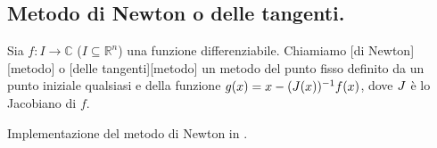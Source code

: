 \subsection{Metodo di Newton o delle tangenti.}
\label{MetodiNumericiPerEquazioni_MetodoDiNewton}
\begin{Definition}
	Sia $f: I \rightarrow \mathbb{C}$ ($I \subseteq \mathbb{R}^n$) una funzione differenziabile. Chiamiamo [di Newton][metodo] o [delle tangenti][metodo] un metodo del punto fisso definito da un punto iniziale qualsiasi e della funzione $g(x) = x - (J(x))^{-1} f(x)$, dove $J$ \`e lo Jacobiano di $f$.
\end{Definition}
\begin{listing}
	\caption{Implementazione del metodo di Newton in .}
\end{listing}
